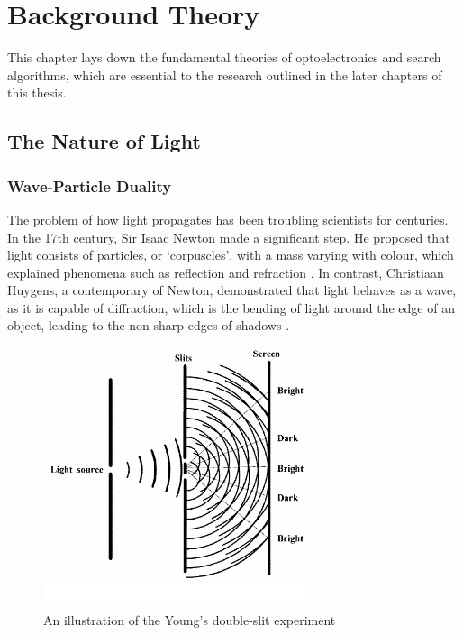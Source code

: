 \chapter{Background Theory} \label{chapter:Literature Review}

\graphicspath{{Chapter_LR/Figs/}}
This chapter lays down the fundamental theories of optoelectronics and search algorithms, which are essential to the research outlined in the later chapters of this thesis.


\section{The Nature of Light}
\subsection{Wave-Particle Duality}
The problem of how light propagates has been troubling scientists for centuries. In the 17th century, Sir Isaac Newton made a significant step. He proposed that light consists of particles, or `corpuscles', with a mass varying with colour, which explained phenomena such as reflection and refraction \cite{Newton1704}. In contrast, Christiaan Huygens, a contemporary of Newton, demonstrated that light behaves as a wave, as it is capable of diffraction, which is the bending of light around the edge of an object, leading to the non-sharp edges of shadows \cite{Huygens1690}.

\begin{figure}[H]
	\centering
	\includegraphics[width=0.7\textwidth]{Youngs-double-slit.jpg}
	\caption{An illustration of the Young's double-slit experiment \cite{Beal2000}}
	\label{fig:Double-slit.eps}
\end{figure}

